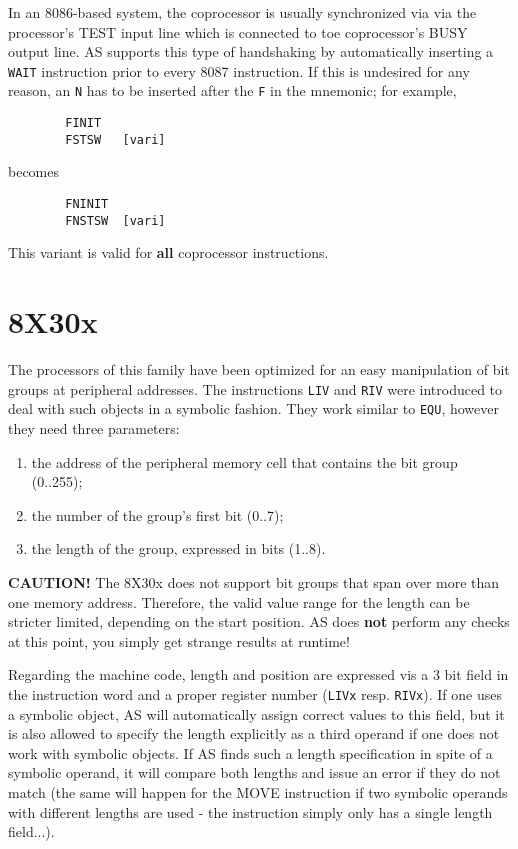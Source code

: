 \documentclass[12pt,twoside]{report}
\newcommand{\bb}[1]{{\bf #1}}
\newcommand{\tty}[1]{{\tt #1}}
\newcommand{\asname}{{AS}}
\begin{document}
In an 8086-based system, the coprocessor is usually synchronized via
via the processor's TEST input line which is connected to toe
coprocessor's BUSY output line.  \asname{} supports this type of handshaking
by automatically inserting a \tty{WAIT} instruction prior to every 8087
instruction.  If this is undesired for any reason, an \tty{N} has to be
inserted after the \tty{F} in the mnemonic; for example,
\begin{verbatim}
        FINIT
        FSTSW   [vari]
\end{verbatim}
becomes
\begin{verbatim}
        FNINIT
        FNSTSW  [vari]
\end{verbatim}
This variant is valid for \bb{all} coprocessor instructions.


\section{8X30x}
\label{8X30xSpec}

The processors of this family have been optimized for an easy manipulation
of bit groups at peripheral addresses.  The instructions \tty{LIV} and
\tty{RIV} were introduced to deal with such objects in a symbolic fashion.
They work similar to \tty{EQU}, however they need three parameters:
\begin{enumerate}
\item{the address of the peripheral memory cell that contains the bit
     group (0..255);}
\item{the number of the group's first bit (0..7);}
\item{the length of the group, expressed in bits (1..8).}
\end{enumerate}
\bb{CAUTION!} The 8X30x does not support bit groups that span over more
than one memory address.  Therefore, the valid value range for the
length can be stricter limited, depending on the start position.  \asname{}
does \bb{not} perform any checks at this point, you simply get strange
results at runtime!

Regarding the machine code, length and position are expressed vis a 3
bit field in the instruction word and a proper register number (\tty{LIVx}
resp. \tty{RIVx}).  If one uses a symbolic object, \asname{} will automatically
assign correct values to this field, but it is also allowed to
specify the length explicitly as a third operand if one does not work
with symbolic objects.  If \asname{} finds such a length specification in
spite of a symbolic operand, it will compare both lengths and issue
an error if they do not match (the same will happen for the MOVE
instruction if two symbolic operands with different lengths are used
- the instruction simply only has a single length field...).
\end{document}
